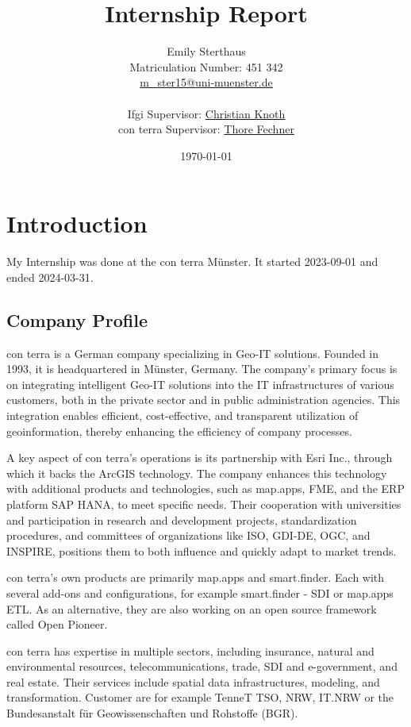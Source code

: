 \documentclass[11pt, titlepage, a4paper]{article}
\title{Internship Report}
\author{Emily Sterthaus \\ Matriculation Number: 451 342 \\ \href{mailto:m_ster15@uni-muenster.de}{m\_ster15@uni-muenster.de}\\ \\
\small Ifgi Supervisor: \href{mailto:christian.knoth@uni-muenster.de}{Christian Knoth}\\ \small con terra Supervisor: \href{mailto:t.fechner@conterra.de}{Thore Fechner}
}
\date{\today}
\begin{document}
\maketitle
\newpage
\tableofcontents
\newpage

\section{Introduction}

My Internship was done at the con terra Münster. It started 2023-09-01 and ended 2024-03-31.
\subsection{Company Profile}

con terra is a German company specializing in Geo-IT solutions. Founded in 1993, it is headquartered in Münster, Germany. The company's primary focus is on integrating intelligent Geo-IT solutions into the IT infrastructures of various customers, both in the private sector and in public administration agencies. This integration enables efficient, cost-effective, and transparent utilization of geoinformation, thereby enhancing the efficiency of company processes.

A key aspect of con terra's operations is its partnership with Esri Inc., through which it backs the ArcGIS technology. The company enhances this technology with additional products and technologies, such as map.apps, FME, and the ERP platform SAP HANA, to meet specific needs. Their cooperation with universities and participation in research and development projects, standardization procedures, and committees of organizations like ISO, GDI-DE, OGC, and INSPIRE, positions them to both influence and quickly adapt to market trends.

con terra's own products are primarily map.apps and smart.finder. Each with several add-ons and configurations, for example smart.finder - SDI or map.apps ETL. As an alternative, they are also working on an open source framework called Open Pioneer.

con terra has expertise in multiple sectors, including insurance, natural and environmental resources, telecommunications, trade, SDI and e-government, and real estate. Their services include spatial data infrastructures, modeling, and transformation. Customer are for example TenneT TSO,   NRW, IT.NRW or the Bundesanstalt für Geowissenschaften und Rohstoffe  (BGR).
\end{document}
